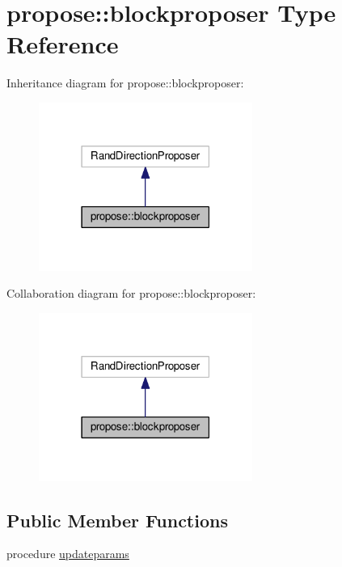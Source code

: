 \hypertarget{structpropose_1_1blockproposer}{}\section{propose\+:\+:blockproposer Type Reference}
\label{structpropose_1_1blockproposer}


Inheritance diagram for propose\+:\+:blockproposer\+:
\nopagebreak
\begin{figure}[H]
\begin{center}
\leavevmode
\includegraphics[width=198pt]{structpropose_1_1blockproposer__inherit__graph}
\end{center}
\end{figure}


Collaboration diagram for propose\+:\+:blockproposer\+:
\nopagebreak
\begin{figure}[H]
\begin{center}
\leavevmode
\includegraphics[width=198pt]{structpropose_1_1blockproposer__coll__graph}
\end{center}
\end{figure}
\subsection*{Public Member Functions}
\begin{DoxyCompactItemize}
\item 
procedure \mbox{\hyperlink{structpropose_1_1blockproposer_ab36ed513060fc1aa09ce24269b46294a}{updateparams}}
\end{DoxyCompactItemize}
